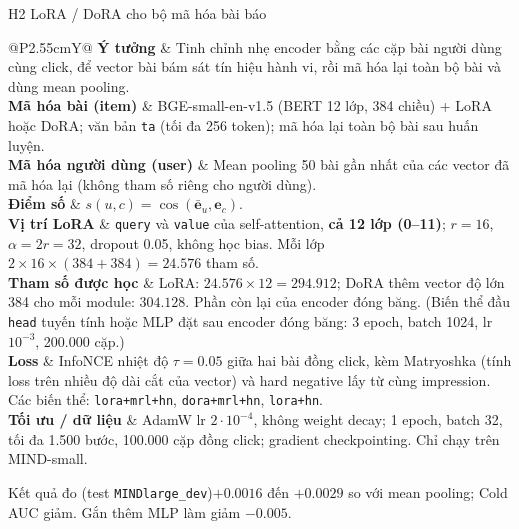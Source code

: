 \documentclass[aspectratio=169,t]{beamer}
\makeatletter
\newcommand{\code}[1]{\texttt{#1}}
\newcommand{\bangmota}[1]{{\scriptsize\renewcommand{\arraystretch}{1.1}\setlength{\tabcolsep}{4pt}%
  \begin{tabularx}{\textwidth}{@{}P{2.55cm}Y@{}}\toprule #1 \bottomrule\end{tabularx}}}
\newcommand{\rw}[2]{\textbf{#1} & #2\\ \midrule}
\newcommand{\rwl}[2]{\textbf{#1} & #2\\}
\newcommand{\ketqua}[1]{\begin{exampleblock}{Kết quả đo (test \code{MINDlarge\_dev})}\scriptsize #1\end{exampleblock}}
\makeatother
\begin{document}
\begin{frame}[shrink]{H2 \textperiodcentered{} LoRA / DoRA cho bộ mã hóa bài báo}
\bangmota{
\rw{Ý tưởng}{Tinh chỉnh nhẹ encoder bằng các cặp bài người dùng cùng click, để vector bài bám sát tín hiệu hành vi, rồi mã hóa lại toàn bộ bài và dùng mean pooling.}
\rw{Mã hóa bài (item)}{BGE-small-en-v1.5 (BERT 12 lớp, 384 chiều) + LoRA hoặc DoRA; văn bản \code{ta} (tối đa 256 token); mã hóa lại toàn bộ bài sau huấn luyện.}
\rw{Mã hóa người dùng (user)}{Mean pooling 50 bài gần nhất của các vector đã mã hóa lại (không tham số riêng cho người dùng).}
\rw{Điểm số}{$s(u,c)=\cos(\bar{\mathbf e}_u,\mathbf e_c)$.}
\rw{Vị trí LoRA}{\code{query} và \code{value} của self-attention, \textbf{cả 12 lớp (0--11)}; $r=16$, $\alpha=2r=32$, dropout 0.05, không học bias. Mỗi lớp $2\times16\times(384+384)=24.576$ tham số.}
\rw{Tham số được học}{LoRA: $24.576\times12=\mathbf{294.912}$; DoRA thêm vector độ lớn 384 cho mỗi module: $\mathbf{304.128}$. Phần còn lại của encoder đóng băng. (Biến thể đầu \code{head} tuyến tính hoặc MLP đặt sau encoder đóng băng: 3 epoch, batch 1024, lr $10^{-3}$, 200.000 cặp.)}
\rw{Loss}{InfoNCE nhiệt độ $\tau=0.05$ giữa hai bài đồng click, kèm Matryoshka (tính loss trên nhiều độ dài cắt của vector) và hard negative lấy từ cùng impression. Các biến thể: \code{lora+mrl+hn}, \code{dora+mrl+hn}, \code{lora+hn}.}
\rwl{Tối ưu / dữ liệu}{AdamW lr $2\cdot10^{-4}$, không weight decay; 1 epoch, batch 32, tối đa 1.500 bước, 100.000 cặp đồng click; gradient checkpointing. Chỉ chạy trên MIND-small.}
}
\ketqua{$+0.0016$ đến $+0.0029$ so với mean pooling; Cold AUC giảm. Gắn thêm MLP làm giảm $-0.005$.}
\par\kern0pt
\end{frame}
\end{document}
